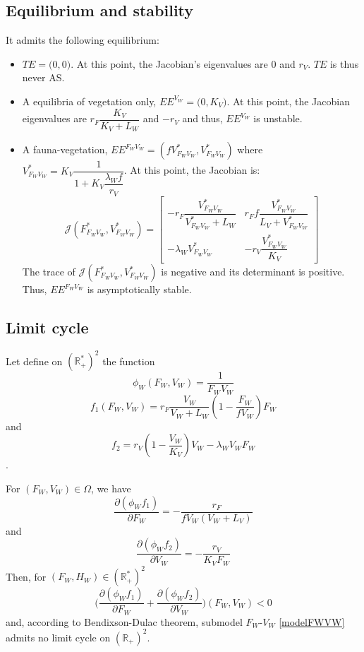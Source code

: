 \documentclass{article}
\newcommand{\lfv}{\lambda_{W}}
\begin{document}
\subsection{Equilibrium and stability}
It admits the following equilibrium:
\begin{itemize}
\item $TE = \Big(0,0 \Big)$. At this point, the Jacobian's eigenvalues are $0$ and $r_V$. $TE$ is thus never AS.
\item A equilibria of vegetation only, $EE^{V_W} = \Big(0, K_V\Big)$. At this point, the Jacobian eigenvalues are $r_F \dfrac{K_V}{K_V + L_W}$ and $-r_V$ and thus, $EE^{V_W}$ is unstable.
\item A fauna-vegetation, $EE^{F_WV_W} = \left(fV^*_{F_WV_W}, V^*_{F_WV_W} \right)$ where $V^*_{F_WV_W} = K_V \dfrac{1}{1+K_V\dfrac{\lfv f}{r_V}}$. At this point, the Jacobian is:
\begin{equation}
\mathcal{J}(F_{F_WV_W}^*, V_{F_WV_W}^*) = \begin{bmatrix}
-r_F \dfrac{V_{F_WV_W}^*}{V_{F_WV_W}^* +L_W}  & r_F f \dfrac{V_{F_WV_W}^*}{L_V + V_{F_WV_W}^*}\\
- \lfv V_{F_WV_W}^* & -r_V \dfrac{V_{F_WV_W}^*}{K_V}
\end{bmatrix}
\end{equation}
The trace of $\mathcal{J}(F_{F_WV_W}^*, V_{F_WV_W}^*)$ is negative and its determinant is positive. Thus, $EE^{F_WV_W}$ is asymptotically stable.
\end{itemize}

\subsection{Limit cycle}
Let define on $(\mathbb{R}^*_+)^2$ the function 
$$\phi_W(F_W, V_W) = \dfrac{1}{F_W V_W}$$
$$f_1(F_W, V_W) = r_F \dfrac{V_W}{V_W + L_W} \left(1 - \dfrac{F_W}{f V_W}\right) F_W$$
 and 
 $$f_2 = r_V \left(1 - \dfrac{V_W}{K_V}\right) V_W - \lfv V_W F_W$$.

For $(F_W, V_W) \in \Omega$, we have
\begin{equation}
\dfrac{\partial (\phi_W f_1)}{\partial F_W} = - \dfrac{r_F}{fV_W (V_W + L_V)}
\end{equation}
and
\begin{equation}
\dfrac{\partial (\phi_W f_2)}{\partial V_W} = - \dfrac{r_V}{K_V F_W}
\end{equation}
Then, for $(F_W, H_W) \in (\mathbb{R}^*_+)^2$
\begin{equation}
\Big(\dfrac{\partial (\phi_W f_1)}{\partial F_W} + \dfrac{\partial (\phi_W f_2)}{\partial V_W}\Big) (F_W, V_W) < 0
\end{equation}
and, according to Bendixson-Dulac theorem, submodel $F_W$-$V_W$ \eqref{modelFWVW} admits no limit cycle on $(\mathbb{R}_+)^2$.
\end{document}
